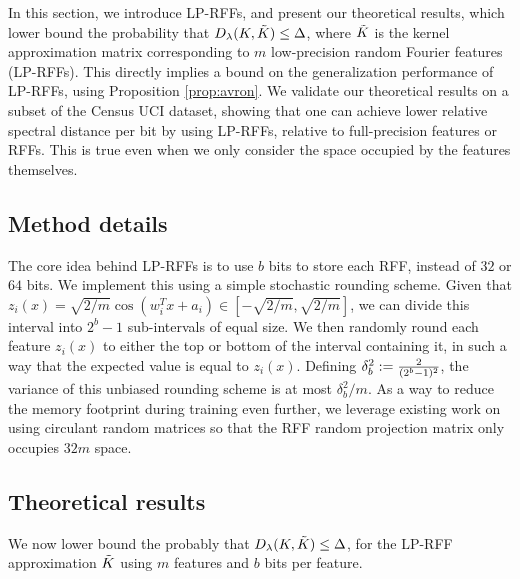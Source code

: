In this section, we introduce LP-RFFs, and present our theoretical results, which lower bound the probability that $D_{\lambda}(K,\tilde{K}) \leq \Delta$, where $\tilde{K}$ is the kernel approximation matrix corresponding to $m$ low-precision random Fourier features (LP-RFFs). This directly implies a bound on the generalization performance of LP-RFFs, using Proposition \ref{prop:avron}. We validate our theoretical results on a subset of the Census UCI dataset, showing that one can achieve lower relative spectral distance per bit by using LP-RFFs, relative to full-precision \Nystrom features or RFFs.  This is true even when we only consider the space occupied by the features themselves.

\subsection{Method details}
\label{subsec:method_details}
The core idea behind LP-RFFs is to use $b$ bits to store each RFF, instead of $32$ or $64$ bits. We implement this using a simple stochastic rounding scheme. Given that $z_i(x) = \sqrt{2/m}\cos(w_i^T x + a_i) \in [-\sqrt{2/m},\sqrt{2/m}]$, we can divide this interval into $2^b - 1$ sub-intervals of equal size. We then randomly round each feature $z_i(x)$ to either the top or bottom of the interval containing it, in such a way that the expected value is equal to $z_i(x)$. Defining $\delta_b^2 := \frac{2}{(2^b-1)^2}$, the variance of this unbiased rounding scheme is at most $\delta_b^2/m$.  As a way to reduce the memory footprint during training even further, we leverage existing work on using circulant random matrices \citep{yu15} so that the RFF random projection matrix only occupies $32m$ space.

\subsection{Theoretical results}

We now lower bound the probably that $D_{\lambda}(K,\tilde{K}) \leq \Delta$, for the LP-RFF approximation $\tilde{K}$ using $m$ features and $b$ bits per feature.

